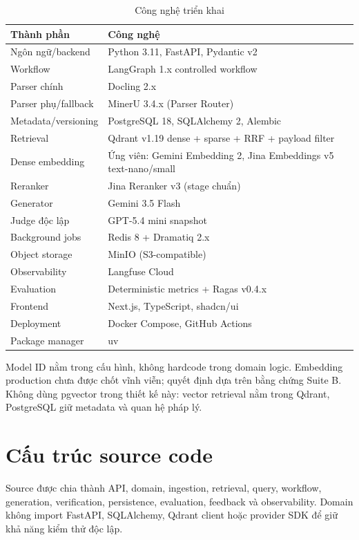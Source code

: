 \documentclass[a4paper,12pt]{extreport}
\begin{document}
\begin{table}[H]
\caption{Công nghệ triển khai}
\begin{tabularx}{\textwidth}{p{4cm}X}
\toprule
\textbf{Thành phần} & \textbf{Công nghệ}\\
\midrule
Ngôn ngữ/backend & Python 3.11, FastAPI, Pydantic v2\\
Workflow & LangGraph 1.x controlled workflow\\
Parser chính & Docling 2.x\\
Parser phụ/fallback & MinerU 3.4.x (Parser Router)\\
Metadata/versioning & PostgreSQL 18, SQLAlchemy 2, Alembic\\
Retrieval & Qdrant v1.19 dense + sparse + RRF + payload filter\\
Dense embedding & Ứng viên: Gemini Embedding 2, Jina Embeddings v5 text-nano/small\\
Reranker & Jina Reranker v3 (stage chuẩn)\\
Generator & Gemini 3.5 Flash\\
Judge độc lập & GPT-5.4 mini snapshot \cite{openai2026gpt54mini}\\
Background jobs & Redis 8 + Dramatiq 2.x\\
Object storage & MinIO (S3-compatible)\\
Observability & Langfuse Cloud\\
Evaluation & Deterministic metrics + Ragas v0.4.x\\
Frontend & Next.js, TypeScript, shadcn/ui\\
Deployment & Docker Compose, GitHub Actions\\
Package manager & uv\\
\bottomrule
\end{tabularx}
\end{table}

Model ID nằm trong cấu hình, không hardcode trong domain logic. Embedding production chưa được chốt vĩnh viễn; quyết định dựa trên bằng chứng Suite B. Không dùng pgvector trong thiết kế này: vector retrieval nằm trong Qdrant, PostgreSQL giữ metadata và quan hệ pháp lý.

\section{Cấu trúc source code}

Source được chia thành API, domain, ingestion, retrieval, query, workflow, generation, verification, persistence, evaluation, feedback và observability. Domain không import FastAPI, SQLAlchemy, Qdrant client hoặc provider SDK để giữ khả năng kiểm thử độc lập.
\end{document}

